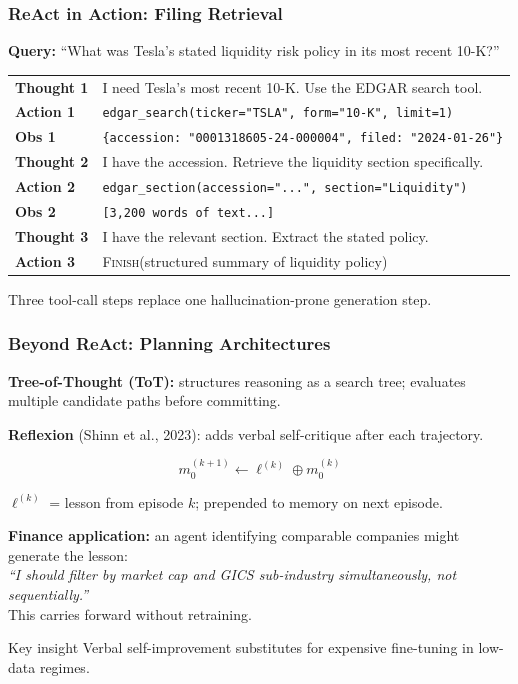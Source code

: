 \documentclass[9pt,t]{beamer}
\begin{document}
\begin{frame}
\frametitle{ReAct in Action: Filing Retrieval}

\textbf{Query:} ``What was Tesla's stated liquidity risk policy in its most recent 10-K?''

\medskip
\footnotesize
\begin{tabular}{p{}p{}}
\textbf{Thought 1} & I need Tesla's most recent 10-K. Use the EDGAR search tool. \\[3pt]
\textbf{Action 1} & \texttt{edgar\_search(ticker="TSLA", form="10-K", limit=1)} \\[3pt]
\textbf{Obs 1} & \texttt{\{accession: "0001318605-24-000004", filed: "2024-01-26"\}} \\[6pt]
\textbf{Thought 2} & I have the accession. Retrieve the liquidity section specifically. \\[3pt]
\textbf{Action 2} & \texttt{edgar\_section(accession="...", section="Liquidity")} \\[3pt]
\textbf{Obs 2} & \texttt{[3,200 words of text...]} \\[6pt]
\textbf{Thought 3} & I have the relevant section. Extract the stated policy. \\[3pt]
\textbf{Action 3} & \textsc{Finish}(structured summary of liquidity policy) \\
\end{tabular}
\normalsize

\medskip
Three tool-call steps replace one hallucination-prone generation step.
\end{frame}

\begin{frame}
\frametitle{Beyond ReAct: Planning Architectures}

\textbf{Tree-of-Thought (ToT):} structures reasoning as a search tree;
evaluates multiple candidate paths before committing.

\medskip
\textbf{Reflexion} (Shinn et al., 2023): adds verbal self-critique after each trajectory.

\[
  m_0^{(k+1)} \gets \ell^{(k)} \oplus m_0^{(k)}
\]

$\ell^{(k)}$ = lesson from episode $k$; prepended to memory on next episode.

\medskip
\textbf{Finance application:} an agent identifying comparable companies might generate the lesson:\\
\textit{``I should filter by market cap and GICS sub-industry simultaneously,
not sequentially.''}\\
This carries forward without retraining.

\medskip
\begin{block}{Key insight}
Verbal self-improvement substitutes for expensive fine-tuning in low-data regimes.
\end{block}
\end{frame}
\end{document}
